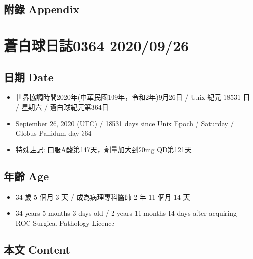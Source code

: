 \documentclass[a5paper, 11pt
]{book}
\providecommand{\tightlist}{%
  \setlength{\itemsep}{0pt}\setlength{\parskip}{0pt}}
\begin{document}
\hypertarget{ux9644ux9304-appendix-24}{%
\subsection{附錄 Appendix}\label{ux9644ux9304-appendix-24}}

\hypertarget{ux84bcux767dux7403ux65e5ux8a8c0364-20200926}{%
\section{蒼白球日誌0364
2020/09/26}\label{ux84bcux767dux7403ux65e5ux8a8c0364-20200926}}

\hypertarget{ux65e5ux671f-date-25}{%
\subsection{日期 Date}\label{ux65e5ux671f-date-25}}

\begin{itemize}
\tightlist
\item
  世界協調時間2020年(中華民國109年，令和2年)9月26日 / Unix 紀元 18531 日
  / 星期六 / 蒼白球紀元第364日
\item
  September 26, 2020 (UTC) / 18531 days since Unix Epoch / Saturday /
  Globus Pallidum day 364
\item
  特殊註記: 口服A酸第147天，劑量加大到20mg QD第121天
\end{itemize}

\hypertarget{ux5e74ux9f61-age-25}{%
\subsection{年齡 Age}\label{ux5e74ux9f61-age-25}}

\begin{itemize}
\tightlist
\item
  34 歲 5 個月 3 天 / 成為病理專科醫師 2 年 11 個月 14 天
\item
  34 years 5 months 3 days old / 2 years 11 months 14 days after
  acquiring ROC Surgical Pathology Licence
\end{itemize}

\hypertarget{ux672cux6587-content-25}{%
\subsection{本文 Content}\label{ux672cux6587-content-25}}
\end{document}
